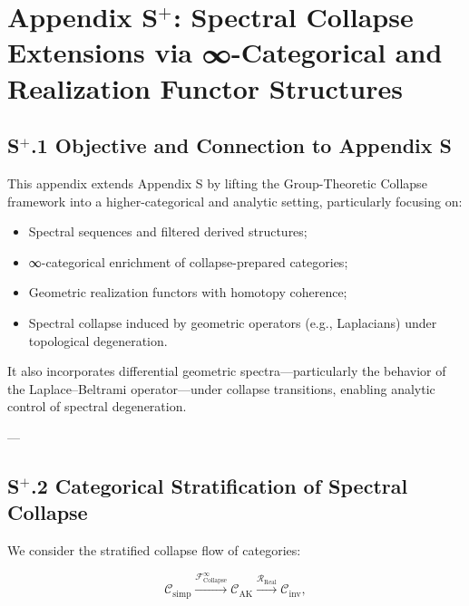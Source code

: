 \documentclass[11pt]{article}
\begin{document}

\section*{Appendix S$^{+}$: Spectral Collapse Extensions via ∞-Categorical and Realization Functor Structures}

\subsection*{S$^{+}$.1 Objective and Connection to Appendix S}

This appendix extends Appendix S by lifting the Group-Theoretic Collapse framework into a higher-categorical and analytic setting, particularly focusing on:

\begin{itemize}
    \item Spectral sequences and filtered derived structures;
    \item ∞-categorical enrichment of collapse-prepared categories;
    \item Geometric realization functors with homotopy coherence;
    \item Spectral collapse induced by geometric operators (e.g., Laplacians) under topological degeneration.
\end{itemize}

It also incorporates differential geometric spectra—particularly the behavior of the Laplace–Beltrami operator—under collapse transitions, enabling analytic control of spectral degeneration.

---

\subsection*{S$^{+}$.2 Categorical Stratification of Spectral Collapse}

We consider the stratified collapse flow of categories:

\[
\mathcal{C}_{\mathrm{simp}} 
\xrightarrow{\mathcal{F}_{\mathrm{Collapse}}^\infty} 
\mathcal{C}_{\mathrm{AK}} 
\xrightarrow{\mathcal{R}_{\mathrm{Real}}} 
\mathcal{C}_{\mathrm{inv}},
\]
\end{document}
